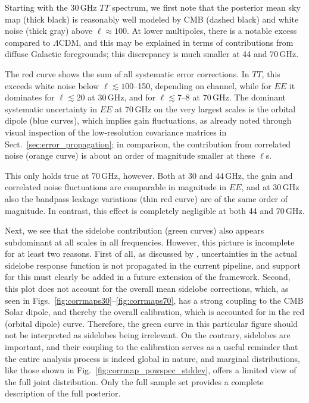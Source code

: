 \documentclass[twocolumn]{aa}
\begin{document}
Starting with the 30\,GHz $TT$ spectrum, we first note that the
posterior mean sky map (thick black) is reasonably well modeled by
CMB (dashed black) and white noise (thick gray) above
$\ell\approx100$. At lower multipoles, there is a notable excess
compared to $\Lambda$CDM, and this may be explained in terms of
contributions from diffuse Galactic foregrounds; this discrepancy is
much smaller at 44 and 70\,GHz.

The red curve shows the sum of all systematic error corrections. In
$TT$, this exceeds white noise below
$\ell\lesssim100$--150, depending on channel, while for $EE$ it
dominates for $\ell\lesssim20$ at 30\,GHz, and for $\ell\lesssim7$--8
at 70\,GHz. The dominant systematic uncertainty in $EE$ at 70\,GHz on
the very largest scales is the orbital dipole (blue curves), which
implies gain fluctuations, as already noted through visual inspection
of the low-resolution covariance matrices in
Sect.~\ref{sec:error_propagation}; in comparison, the contribution
from correlated noise (orange curve) is about an order of magnitude
smaller at these $\ell$s.

This only holds true at 70\,GHz, however. Both at 30 and 44\,GHz, the
gain and correlated noise fluctuations are comparable in magnitude in $EE$,
and at 30\,GHz also the bandpass leakage variations (thin red curve)
are of the same order of magnitude. In contrast, this effect is
completely negligible at both 44 and 70\,GHz.

Next, we see that the sidelobe contribution (green curves) also
appears subdominant at all scales in all frequencies. However, this
picture is incomplete for at least two reasons. First of all, as
discussed by \citet{bp08}, uncertainties in the actual sidelobe
response function is not propagated in the current pipeline, and
support for this must clearly be added in a future extension of the
framework. Second, this plot does not account for the overall mean
sidelobe corrections, which, as seen in
Figs.~\ref{fig:corrmaps30}--\ref{fig:corrmaps70}, has a strong
coupling to the CMB Solar dipole, and thereby the overall calibration,
which is accounted for in the red (orbital dipole) curve. Therefore, 
the green curve in this particular figure should not be
interpreted as sidelobes being irrelevant. On the contrary, sidelobes
are important, and their coupling to the calibration serves as a
useful reminder that the entire analysis process is indeed global in
nature, and marginal distributions, like those shown in
Fig.~\ref{fig:corrmap_powspec_stddev}, offers a limited view of the
full joint distribution. Only the full sample set provides a complete
description of the full posterior.
\end{document}
